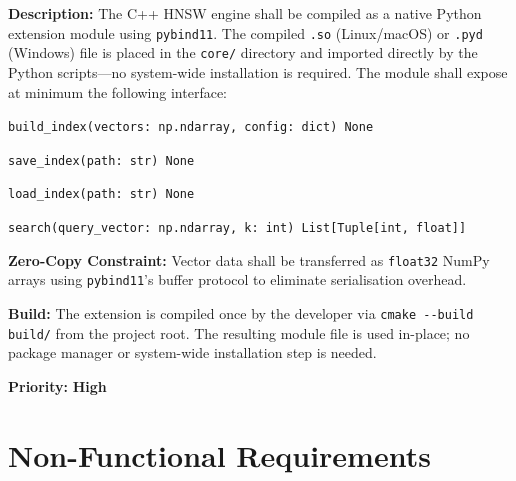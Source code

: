 \documentclass[12pt, a4paper]{article}
\begin{document}
\begin{tcolorbox}[enhanced, colback=white, colframe=ctPurple,
    colbacktitle=ctLightPurple, coltitle=ctPurple, boxrule=0.5pt,
    leftrule=4pt, arc=2mm, fonttitle=\large\bfseries,
    title={FR-8: Python--C++ Runtime Bridge},
    drop fuzzy shadow=black!5!white, top=2pt, bottom=2pt]
\begin{prolist}
    \item \textbf{Description:} The C++ HNSW engine shall be compiled as a
    native Python extension module using \texttt{pybind11}. The compiled
    \texttt{.so} (Linux/macOS) or \texttt{.pyd} (Windows) file is placed in
    the \texttt{core/} directory and imported directly by the Python
    scripts---no system-wide installation is required. The module shall
    expose at minimum the following interface:
    \begin{prolist}
        \item \texttt{build\_index(vectors: np.ndarray, config: dict)
              \textrightarrow{} None}
        \item \texttt{save\_index(path: str)
              \textrightarrow{} None}
        \item \texttt{load\_index(path: str)
              \textrightarrow{} None}
        \item \texttt{search(query\_vector: np.ndarray, k: int)
              \textrightarrow{} List[Tuple[int, float]]}
    \end{prolist}

    \item \textbf{Zero-Copy Constraint:} Vector data shall be transferred as
    \texttt{float32} NumPy arrays using \texttt{pybind11}'s buffer protocol
    to eliminate serialisation overhead.

    \item \textbf{Build:} The extension is compiled once by the developer
    via \texttt{cmake -{-}build build/} from the project root. The resulting
    module file is used in-place; no package manager or system-wide
    installation step is needed.

    \item \textbf{Priority:} \textcolor{alertRed}{\textbf{High}}
\end{prolist}
\end{tcolorbox}

\section{Non-Functional Requirements}
\end{document}
